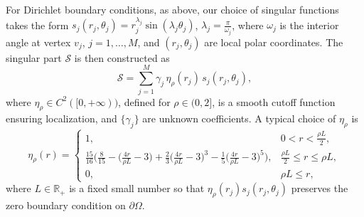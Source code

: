\documentclass{article}
\numberwithin{equation}{section}
\begin{document}
For Dirichlet boundary conditions, as above, our choice of singular functions takes the form
$s_j(r_j,\theta_j) = r_j^{\lambda_j} \sin(\lambda_j \theta_j)$, 
$\lambda_j = \frac{\pi}{\omega_j}$,
where $\omega_j$ is the interior angle at vertex $v_j$, $j=1,\ldots, M$, and $(r_j,\theta_j)$ are local polar coordinates. The singular part $\mathcal{S}$ is then constructed as
\begin{equation}
\mathcal{S} = \sum_{j=1}^M \gamma_j \, \eta_\rho(r_j)\, s_j(r_j,\theta_j),
\end{equation}
where $\eta_\rho\in C^2([0,+\infty))$, defined for $\rho \in(0,2]$, is a smooth cutoff function ensuring localization, and $\{\gamma_j\}$ are unknown coefficients. A typical choice of $\eta_\rho$ is 
\begin{equation}\label{equa:rho}
\eta_\rho(r)=
\begin{cases}
1, & 0<r<\frac{\rho L}{2},\\
\frac{15}{16}\bigg(\frac{8}{15}-\big(\frac{4r}{\rho L}-3\big)+\frac{2}{3}\big(\frac{4r}{\rho L}-3\big)^3-\frac{1}{5}\big(\frac{4r}{\rho L}-3\big)^5\bigg) ,
& \frac{\rho L}{2}\le r\le \rho L,\\
0, & \rho L\le r,
\end{cases}
\end{equation}
where $L\in \mathbb{R}_{+}$ is a fixed small number so that $\eta_\rho(r_j)s_j(r_j,\theta_j)$ preserves the zero boundary condition on $\partial \Omega$.
\end{document}

